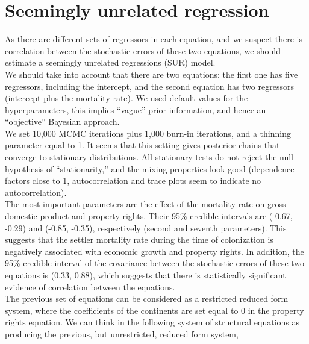 \section{Seemingly unrelated regression}\label{sec72}

As there are different sets of regressors in each equation, and we suspect there is correlation between the stochastic errors of these two equations, we should estimate a seemingly unrelated regressions (SUR) model.\\

We should take into account that there are two equations: the first one has five regressors, including the intercept, and the second equation has two regressors (intercept plus the mortality rate).
We used default values for the hyperparameters, this implies ``vague'' prior information, and hence an ``objective'' Bayesian approach.\\

We set 10,000 MCMC iterations plus 1,000 burn-in iterations, and a thinning parameter equal to 1.
It seems that this setting gives posterior chains that converge to stationary distributions.
All stationary tests do not reject the null hypothesis of ``stationarity,'' and the mixing properties look good (dependence factors close to 1, autocorrelation and trace plots seem to indicate no autocorrelation).\\

The most important parameters are the effect of the mortality rate on gross domestic product and property rights.
Their 95\% credible intervals are (-0.67, -0.29) and (-0.85, -0.35), respectively (second and seventh parameters).
This suggests that the settler mortality rate during the time of colonization is negatively associated with economic growth and property rights.
In addition, the 95\% credible interval of the covariance between the stochastic errors of these two equations is (0.33, 0.88), which suggests that there is statistically significant evidence of correlation between the equations.\\

The previous set of equations can be considered as a restricted reduced form system, where the coefficients of the continents are set equal to 0 in the property rights equation.
We can think in the following system of structural equations as producing the previous, but unrestricted, reduced form system,



